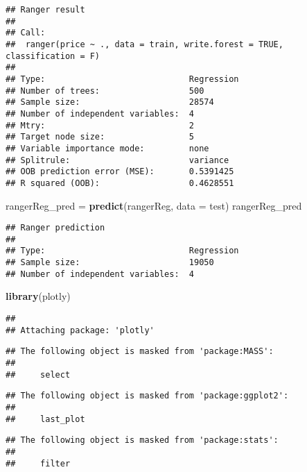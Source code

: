 \documentclass[
]{article}
\newenvironment{Shaded}{\begin{snugshade}}{\end{snugshade}}
\newcommand{\DataTypeTok}[1]{\textcolor[rgb]{0.13,0.29,0.53}{#1}}
\newcommand{\KeywordTok}[1]{\textcolor[rgb]{0.13,0.29,0.53}{\textbf{#1}}}
\newcommand{\NormalTok}[1]{#1}
\newcommand{\StringTok}[1]{\textcolor[rgb]{0.31,0.60,0.02}{#1}}
\begin{document}
\begin{verbatim}
## Ranger result
## 
## Call:
##  ranger(price ~ ., data = train, write.forest = TRUE, classification = F) 
## 
## Type:                             Regression 
## Number of trees:                  500 
## Sample size:                      28574 
## Number of independent variables:  4 
## Mtry:                             2 
## Target node size:                 5 
## Variable importance mode:         none 
## Splitrule:                        variance 
## OOB prediction error (MSE):       0.5391425 
## R squared (OOB):                  0.4628551
\end{verbatim}

\begin{Shaded}
\begin{Highlighting}[]
\NormalTok{rangerReg_pred =}\StringTok{ }\KeywordTok{predict}\NormalTok{(rangerReg, }\DataTypeTok{data =}\NormalTok{ test)}
\NormalTok{rangerReg_pred}
\end{Highlighting}
\end{Shaded}

\begin{verbatim}
## Ranger prediction
## 
## Type:                             Regression 
## Sample size:                      19050 
## Number of independent variables:  4
\end{verbatim}

\begin{Shaded}
\begin{Highlighting}[]
\KeywordTok{library}\NormalTok{(plotly)}
\end{Highlighting}
\end{Shaded}

\begin{verbatim}
## 
## Attaching package: 'plotly'
\end{verbatim}

\begin{verbatim}
## The following object is masked from 'package:MASS':
## 
##     select
\end{verbatim}

\begin{verbatim}
## The following object is masked from 'package:ggplot2':
## 
##     last_plot
\end{verbatim}

\begin{verbatim}
## The following object is masked from 'package:stats':
## 
##     filter
\end{verbatim}
\end{document}
